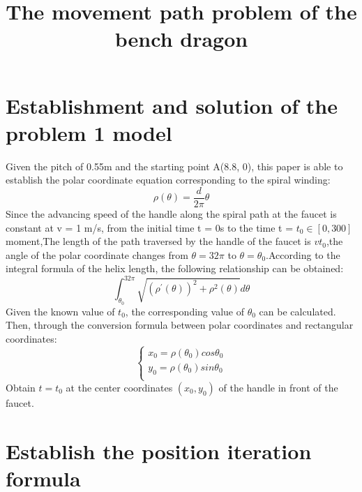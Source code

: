 \documentclass{article}
\title{The movement path problem of the bench dragon}
\begin{document}
\maketitle
\section{Establishment and solution of the problem 1 model}
Given the pitch of 0.55m and the starting point A(8.8, 0), this paper is able to establish the polar coordinate equation corresponding to the spiral winding:
\begin{equation}
\rho(\theta)=\frac{d}{2\pi}\theta
\end{equation}
Since the advancing speed of the handle along the spiral path at the faucet is constant at v = 1 m/s, from the initial time t = 0s to the time t = $t_0\in[0,300]$moment,The length of the path traversed by the handle of the faucet is $vt_0$,the angle of the polar coordinate changes from $\theta=32\pi$ to $\theta=\theta_{0}$.According to the integral formula of the helix length, the following relationship can be obtained:
\begin{equation}
\int_{\theta_0}^{32\pi}\sqrt{{(\rho^{'}(\theta))}^2+\rho^{2}(\theta)}d\theta
\end{equation}
Given the known value of $t_0$, the corresponding value of $\theta_0$ can be calculated. Then, through the conversion formula between polar coordinates and rectangular coordinates:
\begin{equation}
\begin{cases}
x_0=\rho{(\theta_0)}cos\theta_0\\
y_0=\rho{(\theta_0)}sin\theta_0\\
\end{cases}
\end{equation}
Obtain $t = t_0$ at the center coordinates $(x_0,y_0)$ of the handle in front of the faucet.
\section{Establish the position iteration formula}
\end{document}
